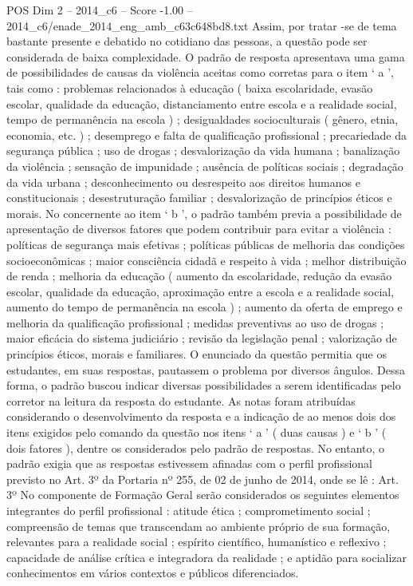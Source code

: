 \begin{textsample}{POS Dim 2 – 2014\_c6 – Score -1.00 – 2014\_c6/enade\_2014\_eng\_amb\_c63c648bd8.txt}
Assim, por tratar -se de tema bastante presente e debatido no cotidiano das pessoas, a questão pode ser considerada de baixa complexidade.
O padrão de resposta apresentava uma gama de possibilidades de causas da violência aceitas como corretas para o item ‘ a ’, tais como : problemas relacionados à educação ( baixa escolaridade, evasão escolar, qualidade da educação, distanciamento entre escola e a realidade social, tempo de permanência na escola ) ; desigualdades socioculturais ( gênero, etnia, economia, etc. ) ; desemprego e falta de qualificação profissional ; precariedade da segurança pública ; uso de drogas ; desvalorização da vida humana ; banalização da violência ; sensação de impunidade ; ausência de políticas sociais ; degradação da vida urbana ; desconhecimento ou desrespeito aos direitos humanos e constitucionais ; desestruturação familiar ; desvalorização de princípios éticos e morais.
No concernente ao item ‘ b ’, o padrão também previa a possibilidade de apresentação de diversos fatores que podem contribuir para evitar a violência : políticas de segurança mais efetivas ; políticas públicas de melhoria das condições socioeconômicas ; maior consciência cidadã e respeito à vida ; melhor distribuição de renda ; melhoria da educação ( aumento da escolaridade, redução da evasão escolar, qualidade da educação, aproximação entre a escola e a realidade social, aumento do tempo de permanência na escola ) ; aumento da oferta de emprego e melhoria da qualificação profissional ; medidas preventivas ao uso de drogas ; maior eficácia do sistema judiciário ; revisão da legislação penal ; valorização de princípios éticos, morais e familiares.
O enunciado da questão permitia que os estudantes, em suas respostas, pautassem o problema por diversos ângulos.
Dessa forma, o padrão buscou indicar diversas possibilidades a serem identificadas pelo corretor na leitura da resposta do estudante.
As notas foram atribuídas considerando o desenvolvimento da resposta e a indicação de ao menos dois dos itens exigidos pelo comando da questão nos itens ‘ a ’ ( duas causas ) e ‘ b ’ ( dois fatores ), dentre os considerados pelo padrão de respostas.
No entanto, o padrão exigia que as respostas estivessem afinadas com o perfil profissional previsto no Art. 3º da Portaria nº 255, de 02 de junho de 2014, onde se lê : Art. 3º No componente de Formação Geral serão considerados os seguintes elementos integrantes do perfil profissional : atitude ética ; comprometimento social ; compreensão de temas que transcendam ao ambiente próprio de sua formação, relevantes para a realidade social ; espírito científico, humanístico e reflexivo ; capacidade de análise crítica e integradora da realidade ; e aptidão para socializar conhecimentos em vários contextos e públicos diferenciados.

\end{textsample}

